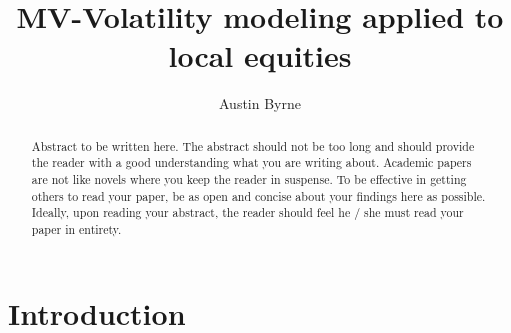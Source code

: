 \documentclass[12pt,preprint, authoryear]{elsarticle}
\numberwithin{equation}{section}
\numberwithin{figure}{section}
\numberwithin{table}{section}
\begin{document}
\begin{frontmatter}  %

\title{MV-Volatility modeling applied to local equities}





\author[Add1]{Austin Byrne}





\address[Add1]{Stellenbosch University}


\begin{abstract}
\small{
Abstract to be written here. The abstract should not be too long and
should provide the reader with a good understanding what you are writing
about. Academic papers are not like novels where you keep the reader in
suspense. To be effective in getting others to read your paper, be as
open and concise about your findings here as possible. Ideally, upon
reading your abstract, the reader should feel he / she must read your
paper in entirety.
}
\end{abstract}

\vspace{1cm}





\vspace{0.5cm}

\end{frontmatter}

\setcounter{footnote}{0}



\pagestyle{fancy}
\chead{}
\rhead{}
\lfoot{}
\lhead{}
\cfoot{}


\headsep 35pt %




\hypertarget{introduction}{%
\section{\texorpdfstring{Introduction
\label{Introduction}}{Introduction }}\label{introduction}}
\end{document}
